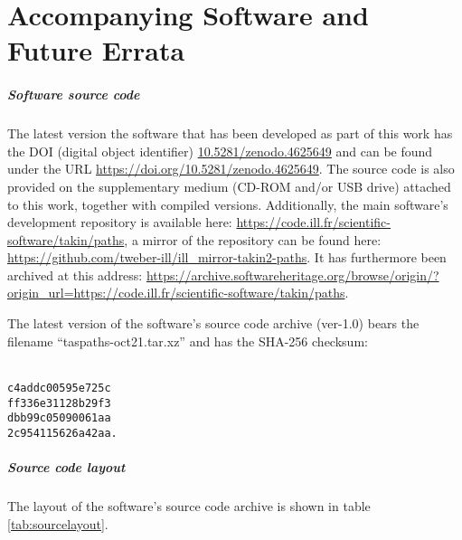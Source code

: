 %
%

\chapter{Accompanying Software and Future Errata}
\label{ch:online}

\paragraph{Software source code}
The latest version the software that has been developed 
as part of this work has the DOI (digital object identifier)
\href{https://doi.org/10.5281/zenodo.4625649}{10.5281/zenodo.4625649}
and can be found under the URL \url{https://doi.org/10.5281/zenodo.4625649}.
The source code is also provided on the supplementary medium (CD-ROM and/or USB drive) 
attached to this work, together with compiled versions.
Additionally, the main software's development repository is available here: 
\url{https://code.ill.fr/scientific-software/takin/paths},
a mirror of the repository can be found here: 
\url{https://github.com/tweber-ill/ill_mirror-takin2-paths}.
It has furthermore been archived at this address:
\url{https://archive.softwareheritage.org/browse/origin/?origin_url=https://code.ill.fr/scientific-software/takin/paths}.

The latest version of the software's source code archive (ver-1.0) bears the 
filename ``taspaths-oct21.tar.xz'' and has the SHA-256 \cite{web_sha256sum}
checksum:

\begin{centering}
\texttt{\\
c4addc00595e725c\phantom{.} \\
ff336e31128b29f3\phantom{.} \\
dbb99c05090061aa\phantom{.} \\
2c954115626a42aa.}\\
\end{centering}


\paragraph{Source code layout}
The layout of the software's source code archive is shown in table \ref{tab:sourcelayout}.

